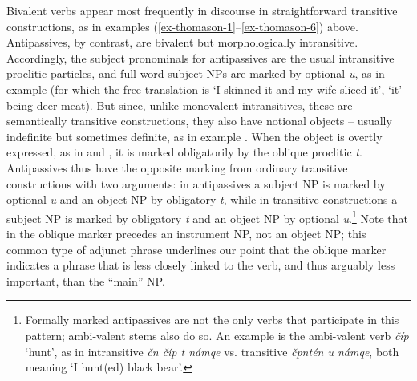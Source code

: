 \documentclass[output=paper,colorlinks,citecolor=brown]{langscibook}
\begin{document}
Bivalent verbs appear most frequently in discourse in straightforward
transitive constructions, as in examples (\ref{ex-thomason-1}--\ref{ex-thomason-6}) 
above.  Antipassives, by
contrast, are bivalent but morphologically intransitive.  Accordingly,
the subject pronominals for antipassives are the usual intransitive
proclitic particles, and full-word subject NPs are marked by optional
\emph{{\textltilde}u}, as in example  (for which the free translation is
`I skinned it and my wife sliced it', `it' being deer meat).  But
since, unlike monovalent intransitives, these are semantically
transitive constructions, they also have notional objects -- usually
indefinite but sometimes definite, as in example .  When the object is
overtly expressed, as in  and , it is marked obligatorily by the
oblique proclitic \emph{t}.  Antipassives thus have the opposite
marking from ordinary transitive constructions with two arguments: in
antipassives a subject NP is marked by optional \emph{{\textltilde}u}
and an object NP by obligatory \emph{t}, while in transitive
constructions a subject NP is marked by obligatory \emph{t} and an
object NP by optional \emph{{\textltilde}u}.\footnote{Formally marked
antipassives are not the only verbs that participate in this pattern;
ambi-valent stems also do so.  An example is the ambi-valent verb \emph{\v{c}{\textltilde}\'ip} `hunt', as in intransitive \emph{\v{c}n
 \v{c}{\textltilde}\'ip t n{\textltilde}\'amqe} vs. transitive \emph{\v{c}{\textltilde}pnt\'en {\textltilde}u n{\textltilde}\'amqe}, both
meaning `I hunt(ed) black bear'.} Note that in  the oblique marker
precedes an instrument NP, not an object NP; this common type of
adjunct phrase underlines our point that the oblique marker indicates
a phrase that is less closely linked to the verb, and thus arguably
less important, than the ``main'' NP.
\end{document}
